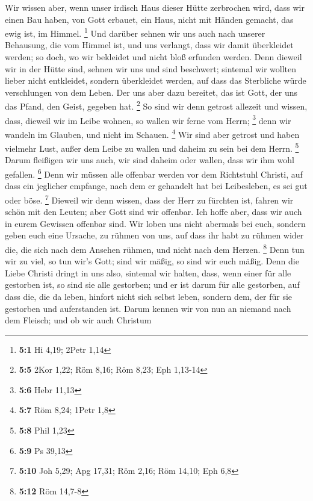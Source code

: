  Wir wissen aber, wenn unser irdisch Haus dieser Hütte
zerbrochen wird, dass wir einen Bau haben, von Gott erbauet, ein Haus,
nicht mit Händen gemacht, das ewig ist, im Himmel. \footnote{\textbf{5:1}
  Hi 4,19; 2Petr 1,14}  Und darüber sehnen wir uns auch
nach unserer Behausung, die vom Himmel ist, und uns verlangt, dass wir
damit überkleidet werden;  so doch, wo wir bekleidet und
nicht bloß erfunden werden.  Denn dieweil wir in der Hütte
sind, sehnen wir uns und sind beschwert; sintemal wir wollten lieber
nicht entkleidet, sondern überkleidet werden, auf dass das Sterbliche
würde verschlungen von dem Leben.  Der uns aber dazu
bereitet, das ist Gott, der uns das Pfand, den Geist, gegeben hat.
\footnote{\textbf{5:5} 2Kor 1,22; Röm 8,16; Röm 8,23; Eph 1,13-14}
 So sind wir denn getrost allezeit und wissen, dass,
dieweil wir im Leibe wohnen, so wallen wir ferne vom Herrn; \footnote{\textbf{5:6}
  Hebr 11,13}  denn wir wandeln im Glauben, und nicht im
Schauen. \footnote{\textbf{5:7} Röm 8,24; 1Petr 1,8}  Wir
sind aber getrost und haben vielmehr Lust, außer dem Leibe zu wallen und
daheim zu sein bei dem Herrn. \footnote{\textbf{5:8} Phil 1,23}
 Darum fleißigen wir uns auch, wir sind daheim oder
wallen, dass wir ihm wohl gefallen. \footnote{\textbf{5:9} Ps 39,13}
 Denn wir müssen alle offenbar werden vor dem Richtstuhl
Christi, auf dass ein jeglicher empfange, nach dem er gehandelt hat bei
Leibesleben, es sei gut oder böse. \footnote{\textbf{5:10} Joh 5,29; Apg
  17,31; Röm 2,16; Röm 14,10; Eph 6,8}  Dieweil wir denn
wissen, dass der Herr zu fürchten ist, fahren wir schön mit den Leuten;
aber Gott sind wir offenbar. Ich hoffe aber, dass wir auch in eurem
Gewissen offenbar sind.  Wir loben uns nicht abermals bei
euch, sondern geben euch eine Ursache, zu rühmen von uns, auf dass ihr
habt zu rühmen wider die, die sich nach dem Ansehen rühmen, und nicht
nach dem Herzen. \footnote{\textbf{5:12} Röm 14,7-8} 
Denn tun wir zu viel, so tun wir's Gott; sind wir mäßig, so sind wir
euch mäßig.  Denn die Liebe Christi dringt in uns also,
sintemal wir halten, dass, wenn einer für alle gestorben ist, so sind
sie alle gestorben;  und er ist darum für alle gestorben,
auf dass die, die da leben, hinfort nicht sich selbst leben, sondern
dem, der für sie gestorben und auferstanden ist.  Darum
kennen wir von nun an niemand nach dem Fleisch; und ob wir auch Christum
